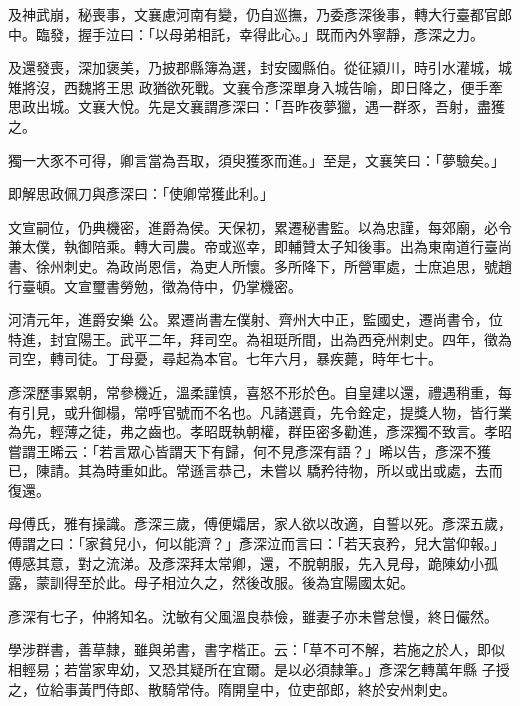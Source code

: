 \begin{pinyinscope}
 及神武崩，秘喪事，文襄慮河南有變，仍自巡撫，乃委彥深後事，轉大行臺都官郎中。臨發，握手泣曰：「以母弟相託，幸得此心。」既而內外寧靜，彥深之力。



 及還發喪，深加褒美，乃披郡縣簿為選，封安國縣伯。從征潁川，時引水灌城，城雉將沒，西魏將王思
 政猶欲死戰。文襄令彥深單身入城告喻，即日降之，便手牽思政出城。文襄大悅。先是文襄謂彥深曰：「吾昨夜夢獵，遇一群豕，吾射，盡獲之。



 獨一大豕不可得，卿言當為吾取，須臾獲豕而進。」至是，文襄笑曰：「夢驗矣。」



 即解思政佩刀與彥深曰：「使卿常獲此利。」



 文宣嗣位，仍典機密，進爵為侯。天保初，累遷秘書監。以為忠謹，每郊廟，必令兼太僕，執御陪乘。轉大司農。帝或巡幸，即輔贊太子知後事。出為東南道行臺尚書、徐州刺史。為政尚恩信，為吏人所懷。多所降下，所營軍處，士庶追思，號趙行臺頓。文宣璽書勞勉，徵為侍中，仍掌機密。



 河清元年，進爵安樂
 公。累遷尚書左僕射、齊州大中正，監國史，遷尚書令，位特進，封宜陽王。武平二年，拜司空。為祖珽所間，出為西兗州刺史。四年，徵為司空，轉司徒。丁母憂，尋起為本官。七年六月，暴疾薨，時年七十。



 彥深歷事累朝，常參機近，溫柔謹慎，喜怒不形於色。自皇建以還，禮遇稍重，每有引見，或升御榻，常呼官號而不名也。凡諸選貢，先令銓定，提獎人物，皆行業為先，輕薄之徒，弗之齒也。孝昭既執朝權，群臣密多勸進，彥深獨不致言。孝昭嘗謂王晞云：「若言眾心皆謂天下有歸，何不見彥深有語？」晞以告，彥深不獲已，陳請。其為時重如此。常遜言恭己，未嘗以
 驕矜待物，所以或出或處，去而復還。



 母傅氏，雅有操識。彥深三歲，傅便孀居，家人欲以改適，自誓以死。彥深五歲，傅謂之曰：「家貧兒小，何以能濟？」彥深泣而言曰：「若天哀矜，兒大當仰報。」傅感其意，對之流涕。及彥深拜太常卿，還，不脫朝服，先入見母，跪陳幼小孤露，蒙訓得至於此。母子相泣久之，然後改服。後為宜陽國太妃。



 彥深有七子，仲將知名。沈敏有父風溫良恭儉，雖妻子亦未嘗怠慢，終日儼然。



 學涉群書，善草隸，雖與弟書，書字楷正。云：「草不可不解，若施之於人，即似相輕易；若當家卑幼，又恐其疑所在宜爾。是以必須隸筆。」彥深乞轉萬年縣
 子授之，位給事黃門侍郎、散騎常侍。隋開皇中，位吏部郎，終於安州刺史。




\end{pinyinscope}
